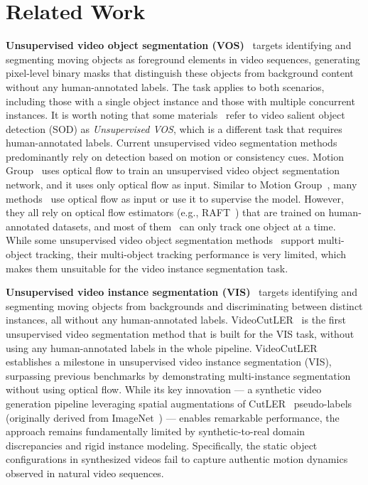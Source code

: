 \section{Related Work}
\label{sec:related}

\textbf{Unsupervised video object segmentation (VOS)}~\cite{ytvos2018, davis16, segtrackv2, FBMS59, moca} targets identifying and segmenting moving objects as foreground elements in video sequences, generating pixel-level binary masks that distinguish these objects from background content without any human-annotated labels. The task applies to both scenarios, including those with a single object instance and those with multiple concurrent instances.
It is worth noting that some materials~\cite{lee2024guided, matnet, ren2021reciprocal, yang2021learning} refer to video salient object detection (SOD) as \textit{Unsupervised VOS}, which is a different task that requires human-annotated labels. Current unsupervised video segmentation methods predominantly rely on detection based on motion or consistency cues. Motion Group~\cite{motiongroup} uses optical flow to train an unsupervised video object segmentation network, and it uses only optical flow as input. Similar to Motion Group~\cite{motiongroup}, many methods~\cite{emdriven, bootstrapping, guessmove, yang2019unsupervised, oclr, ventura2019rvos} use optical flow as input or use it to supervise the model. However, they all rely on optical flow estimators (e.g., RAFT~\cite{raft}) that are trained on human-annotated datasets, and most of them~\cite{emdriven, bootstrapping, guessmove, yang2019unsupervised} can only track one object at a time. While some unsupervised video object segmentation methods~\cite{oclr, ventura2019rvos} support multi-object tracking, their multi-object tracking performance is very limited, which makes them unsuitable for the video instance segmentation task.

\noindent\textbf{Unsupervised video instance segmentation (VIS)}~\cite{ytvis2019, wu2022seqformer, lin2020video, heo2022vita, wang2021end, zhang2023dvis} targets identifying and segmenting moving objects from backgrounds and discriminating between distinct instances, all without any human-annotated labels.
VideoCutLER~\cite{videocutler} is the first unsupervised video segmentation method that is built for the VIS task, without using any human-annotated labels in the whole pipeline. VideoCutLER~\cite{videocutler} establishes a milestone in unsupervised video instance segmentation (VIS), surpassing previous benchmarks by demonstrating multi-instance segmentation without using optical flow. While its key innovation --- a synthetic video generation pipeline leveraging spatial augmentations of CutLER~\cite{cutler} pseudo-labels (originally derived from ImageNet~\cite{imagenet}) --- enables remarkable performance, the approach remains fundamentally limited by synthetic-to-real domain discrepancies and rigid instance modeling. Specifically, the static object configurations in synthesized videos fail to capture authentic motion dynamics observed in natural video sequences.

